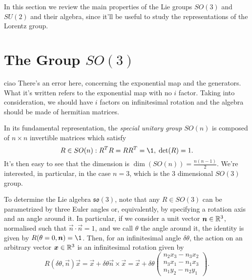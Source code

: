 \color{blue}
In this section we review the main properties of the Lie groups $SO(3)$ and $SU(2)$ and their algebra, since it'll be useful to study the representations of the Lorentz group.

\section{The Group \texorpdfstring{$SO(3)$}{SO(3)}}
\color{red} ciao There's an error here, concerning the exponential map and the generators. What it's written refers to the exponential map with no $i$ factor. Taking into consideration, we should have $i$ factors on infinitesimal rotation and the algebra should be made of hermitian matrices. \color{blue}

In its fundamental representation, the \emph{special unitary group} $SO(n)$ is composed of $n \times n$ invertible matrices which satisfy
\begin{equation}\label{eq:so3-def}
    R \in SO(n) : R^T R = R R^T = \1, \; \det(R) = 1 .
\end{equation}
It's then easy to see that the dimension is $\dim(SO(n)) = \frac{n(n-1)}{2}$. We're interested, in particular, in the case $n=3$, which is the $3$ dimensional $SO(3)$ group.

To determine the Lie algebra $\mathfrak{so}(3)$, note that any $R \in SO(3)$ can be parametrized by three Euler angles or, equivalently, by specifying a rotation axis and an angle around it. In particular, if we consider a unit vector $\boldsymbol{n} \in \mathbb{R}^3$, normalised such that $\vec{n} \cdot \vec{n} = 1$, and we call $\theta$ the angle around it, the identity is given by $R(\theta = 0, \vec{n}) = \1$. Then, for an infinitesimal angle $\delta \theta$, the action on an arbitrary vector $\boldsymbol{x} \in \mathbb{R}^3$ is an infinitesimal rotation given by
\begin{equation}
    R(\delta \theta, \vec{n}) \vec{x} = \vec{x} + \delta \theta \vec{n} \times \vec{x} = \vec{x} + \delta \theta 
    \begin{pmatrix}
        n_2 x_3 - n_3 x_2 \\
        n_3 x_1 - n_1 x_3 \\
        n_1 y_2 - n_2 y_1
    \end{pmatrix}.
\end{equation}

